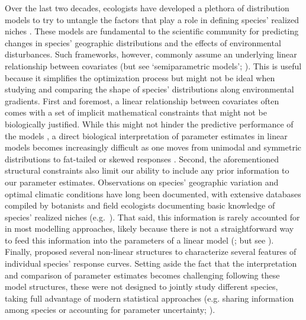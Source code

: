 \documentclass[11pt, a4paper]{article}
\begin{document}
Over the last two decades, ecologists have developed a plethora of distribution models to try to untangle the factors that play a role in defining species' realized niches \citep{guisanPredictiveHabitatDistribution2000}. These models are fundamental to the scientific community for predicting changes in species' geographic distributions and the effects of environmental disturbances. Such frameworks, however, commonly assume an underlying linear relationship between covariates (but see `semiparametric models'; \citealt{norbergComprehensiveEvaluationPredictive2019}). This is useful because it simplifies the optimization process but might not be ideal when studying and comparing the shape of species' distributions along environmental gradients. First and foremost, a linear relationship between covariates often comes with a set of implicit mathematical constraints that might not be biologically justified. While this might not hinder the predictive performance of the models \citep{norbergComprehensiveEvaluationPredictive2019}, a direct biological interpretation of parameter estimates in linear models becomes increasingly difficult as one moves from unimodal and symmetric distributions \citep{terbraakWeightedAveragingLogistic1986, jamilGeneralizedLinearMixed2013} to fat-tailed or skewed responses \citep{huismanHierarchicalSetModels1993}. Second, the aforementioned structural constraints also limit our ability to include any prior information to our parameter estimates. Observations on species' geographic variation and optimal climatic conditions have long been documented, with extensive databases compiled by botanists and field ecologists documenting basic knowledge of species' realized niches (e.g.~\citealt{landoltFloraIndicativaOkologische2010}). That said, this information is rarely accounted for in most modelling approaches, likely because there is not a straightforward way to feed this information into the parameters of a linear model (\citealt{scherrerEcologicalIndicatorValues2019}; but see \citealt{terbraakWeightedAveragingLogistic1986, ovaskainenHowMakeMore2017}). Finally, \citet{huismanHierarchicalSetModels1993} proposed several non-linear structures to characterize several features of individual species' response curves. Setting aside the fact that the interpretation and comparison of parameter estimates becomes challenging following these model structures, these were not designed to jointly study different species, taking full advantage of modern statistical approaches (e.g. sharing information among species or accounting for parameter uncertainty; \citealt{evansProcessbasedRangeModeling2016}).
\end{document}
